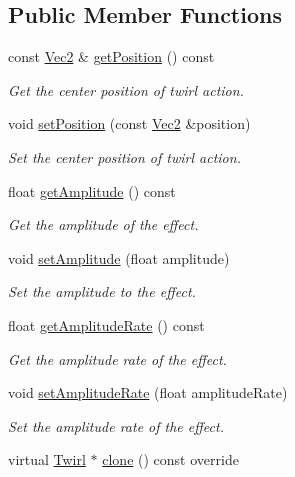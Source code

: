 \subsection*{Public Member Functions}
\begin{DoxyCompactItemize}
\item 
const \hyperlink{classVec2}{Vec2} \& \hyperlink{classTwirl_aad84af7fd087bb5d5442b13737e1004d}{get\+Position} () const
\begin{DoxyCompactList}\small\item\em Get the center position of twirl action. \end{DoxyCompactList}\item 
void \hyperlink{classTwirl_a246973ddc49ac4e1a852e73c879c9bcf}{set\+Position} (const \hyperlink{classVec2}{Vec2} \&position)
\begin{DoxyCompactList}\small\item\em Set the center position of twirl action. \end{DoxyCompactList}\item 
float \hyperlink{classTwirl_adfde81b4bf0f6401c195ab191367c48b}{get\+Amplitude} () const
\begin{DoxyCompactList}\small\item\em Get the amplitude of the effect. \end{DoxyCompactList}\item 
void \hyperlink{classTwirl_abfc08e832e96fcddce09d0e26c84cf91}{set\+Amplitude} (float amplitude)
\begin{DoxyCompactList}\small\item\em Set the amplitude to the effect. \end{DoxyCompactList}\item 
float \hyperlink{classTwirl_afa43bbaf322404dfc8b09707639f5d04}{get\+Amplitude\+Rate} () const
\begin{DoxyCompactList}\small\item\em Get the amplitude rate of the effect. \end{DoxyCompactList}\item 
void \hyperlink{classTwirl_a498a1b1fee7b27570130b6c19ca67b38}{set\+Amplitude\+Rate} (float amplitude\+Rate)
\begin{DoxyCompactList}\small\item\em Set the amplitude rate of the effect. \end{DoxyCompactList}\item 
virtual \hyperlink{classTwirl}{Twirl} $\ast$ \hyperlink{classTwirl_a49ec654e932aa851844dac90fa0cc65c}{clone} () const override

\end{DoxyCompactItemize}
